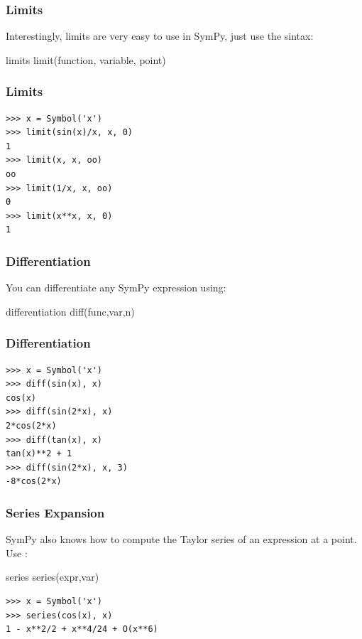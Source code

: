 \documentclass[10pt,colorlinks]{beamer}
\begin{document}
\begin{frame}[fragile]\frametitle{Limits}
Interestingly, limits are very easy to use in SymPy, just use the sintax:
\begin{block}{limits}
limit(function, variable, point)
\end{block}
\end{frame}

\begin{frame}[fragile]\frametitle{Limits}
\begin{verbatim}
>>> x = Symbol('x')
>>> limit(sin(x)/x, x, 0)
1
>>> limit(x, x, oo)
oo
>>> limit(1/x, x, oo)
0
>>> limit(x**x, x, 0)
1
\end{verbatim}

\end{frame}

\begin{frame}[fragile]\frametitle{Differentiation}

You can differentiate any SymPy expression using:

\begin{block}{differentiation}
diff(func,var,n)
\end{block}

\end{frame}

\begin{frame}[fragile]\frametitle{Differentiation}
\begin{verbatim}
>>> x = Symbol('x')
>>> diff(sin(x), x)
cos(x)
>>> diff(sin(2*x), x)
2*cos(2*x)
>>> diff(tan(x), x)
tan(x)**2 + 1
>>> diff(sin(2*x), x, 3)
-8*cos(2*x)
\end{verbatim}


\end{frame}
\begin{frame}[fragile]\frametitle{Series Expansion}
SymPy also knows how to compute the Taylor series of an expression at a point. Use :
\begin{block}{series}
series(expr,var)
\end{block}
\begin{verbatim}
>>> x = Symbol('x')
>>> series(cos(x), x)
1 - x**2/2 + x**4/24 + O(x**6)
\end{verbatim}


\end{frame}
\end{document}
